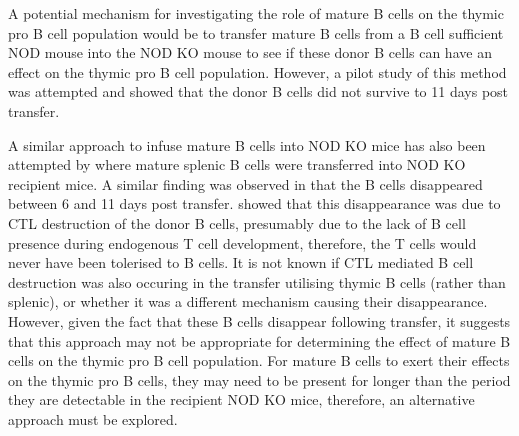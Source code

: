 A potential mechanism for investigating the role of mature B cells on the thymic pro B cell population would be to transfer mature B cells from a B cell sufficient NOD mouse into the NOD KO mouse to see if these donor B cells can have an effect on the thymic pro B cell population.
However, a pilot study of this method was attempted and showed that the donor B cells did not survive to 11 days post transfer.

A similar approach to infuse mature B cells into NOD KO mice has also been attempted by \citet{Serreze1998} where mature splenic B cells were transferred into NOD KO recipient mice. 
A similar finding was observed in that the B cells disappeared between 6 and 11 days post transfer.
\citet{Serreze1998} showed that this disappearance was due to CTL destruction of the donor B cells, presumably due to the lack of B cell presence during endogenous T cell development, therefore, the T cells would never have been tolerised to B cells.
It is not known if CTL mediated B cell destruction was also occuring in the transfer utilising thymic B cells (rather than splenic), or whether it was a different mechanism causing their disappearance. 
However, given the fact that these B cells disappear following transfer, it suggests that this approach may not be appropriate for determining the effect of mature B cells on the thymic pro B cell population.
For mature B cells to exert their effects on the thymic pro B cells, they may need to be present for longer than the period they are detectable in the recipient NOD KO mice, therefore, an alternative approach must be explored.

